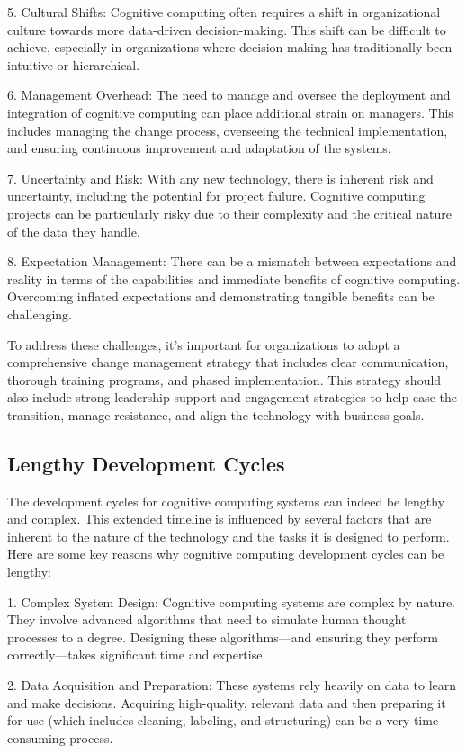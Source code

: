 \documentclass{article}
\begin{document}
\begin{enumerate}
5. Cultural Shifts: Cognitive computing often requires a shift in organizational culture towards more data-driven decision-making. This shift can be difficult to achieve, especially in organizations where decision-making has traditionally been intuitive or hierarchical.

6. Management Overhead: The need to manage and oversee the deployment and integration of cognitive computing can place additional strain on managers. This includes managing the change process, overseeing the technical implementation, and ensuring continuous improvement and adaptation of the systems.

7. Uncertainty and Risk: With any new technology, there is inherent risk and uncertainty, including the potential for project failure. Cognitive computing projects can be particularly risky due to their complexity and the critical nature of the data they handle.

8. Expectation Management: There can be a mismatch between expectations and reality in terms of the capabilities and immediate benefits of cognitive computing. Overcoming inflated expectations and demonstrating tangible benefits can be challenging.

To address these challenges, it's important for organizations to adopt a comprehensive change management strategy that includes clear communication, thorough training programs, and phased implementation. This strategy should also include strong leadership support and engagement strategies to help ease the transition, manage resistance, and align the technology with business goals.

\subsection{Lengthy Development Cycles}
The development cycles for cognitive computing systems can indeed be lengthy and complex. This extended timeline is influenced by several factors that are inherent to the nature of the technology and the tasks it is designed to perform. Here are some key reasons why cognitive computing development cycles can be lengthy:

1. Complex System Design: Cognitive computing systems are complex by nature. They involve advanced algorithms that need to simulate human thought processes to a degree. Designing these algorithms—and ensuring they perform correctly—takes significant time and expertise.

2. Data Acquisition and Preparation: These systems rely heavily on data to learn and make decisions. Acquiring high-quality, relevant data and then preparing it for use (which includes cleaning, labeling, and structuring) can be a very time-consuming process.


\end{enumerate}
\end{document}
